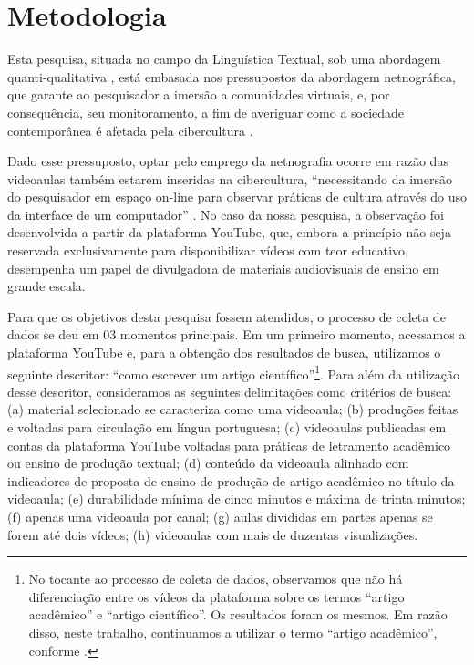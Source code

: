 \section{Metodologia}\label{sec-metodologia}

Esta pesquisa, situada no campo da Linguística Textual, sob uma
abordagem quanti-qualitativa \cite{souza2017}, está embasada nos
pressupostos da abordagem netnográfica, que garante ao pesquisador a
imersão a comunidades virtuais, e, por consequência, seu monitoramento,
a fim de averiguar como a sociedade contemporânea é afetada pela
cibercultura \cite{rocha2005}.

Dado esse pressuposto, optar pelo emprego da netnografia ocorre em razão
das videoaulas também estarem inseridas na cibercultura, ``necessitando
da imersão do pesquisador em espaço on-line para observar práticas de
cultura através do uso da interface de um computador'' \cite[p.~51]{laurentino2023}. No caso da nossa pesquisa, a observação foi
desenvolvida a partir da plataforma YouTube, que, embora a princípio não
seja reservada exclusivamente para disponibilizar vídeos com teor
educativo, desempenha um papel de divulgadora de materiais audiovisuais
de ensino em grande escala.

Para que os objetivos desta pesquisa fossem atendidos, o processo de
coleta de dados se deu em 03 momentos principais. Em um primeiro
momento, acessamos a plataforma YouTube e, para a obtenção dos
resultados de busca, utilizamos o seguinte descritor: ``como escrever um
artigo científico''\footnote{No tocante ao processo de coleta de dados,
  observamos que não há diferenciação entre os vídeos da plataforma
  sobre os termos ``artigo acadêmico'' e ``artigo científico''. Os
  resultados foram os mesmos. Em razão disso, neste trabalho,
  continuamos a utilizar o termo ``artigo acadêmico'', conforme
  \cite{motta-roth2010}.}. Para além da utilização desse
descritor, consideramos as seguintes delimitações como critérios de
busca: (a) material selecionado se caracteriza como uma videoaula; (b)
produções feitas e voltadas para circulação em língua portuguesa; (c)
videoaulas publicadas em contas da plataforma YouTube voltadas para
práticas de letramento acadêmico ou ensino de produção textual; (d)
conteúdo da videoaula alinhado com indicadores de proposta de ensino de
produção de artigo acadêmico no título da videoaula; (e) durabilidade
mínima de cinco minutos e máxima de trinta minutos; (f) apenas uma
videoaula por canal; (g) aulas divididas em partes apenas se forem até
dois vídeos; (h) videoaulas com mais de duzentas visualizações.

